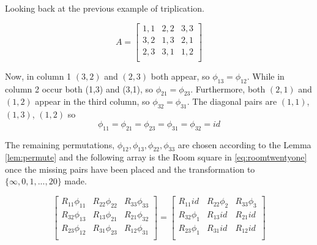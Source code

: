 \begin{example}
Looking back at the previous example of triplication.

\begin{equation}
 A = \begin{bmatrix}
  1,1 & 2,2 & 3,3 \\
  3,2 & 1,3 & 2,1 \\
  2,3 & 3,1 & 1,2 \\
 \end{bmatrix}
\end{equation}

Now, in column 1 $(3, 2)$ and $(2, 3)$ both appear, so $\phi _{13} = \phi _{12}$.
While in column 2 occur both (1,3) and (3,1), so $\phi _{21} = \phi _{23}$.
Furthermore, both $(2, 1)$ and $(1, 2)$ appear in the third column, so $\phi _{32} = \phi _{31}$.
The diagonal pairs are $(1, 1)$, $(1, 3)$, $(1, 2)$ so
\begin{equation}
\phi _{11} = \phi _{21} = \phi _{23} = \phi _{31} = \phi _{32} = id
\end{equation}

The remaining permutations, $\phi _{12}, \phi _{13}, \phi _{22}, \phi _{33}$ are chosen according to the Lemma \ref{lem:permute}
and the following array is the Room square in \ref{eq:roomtwentyone} once the missing pairs have been placed and the transformation to $\{\infty, 0, 1, ..., 20\}$ made.

\begin{equation}
  \begin{bmatrix}
   R_{11}\phi_{11} & R_{22}\phi_{22} & R_{33}\phi_{33} \\
   R_{32}\phi_{13} & R_{13}\phi_{21} & R_{21}\phi_{32} \\
   R_{23}\phi_{12} & R_{31}\phi_{23} & R_{12}\phi_{31} \\
  \end{bmatrix}
  =
  \begin{bmatrix}
      R_{11}id    & R_{22}\phi_{2} & R_{33}\phi_{3} \\
   R_{32}\phi_{1} &   R_{13}id     &    R_{21}id    \\
   R_{23}\phi_{1} &   R_{31}id     &    R_{12}id    \\
  \end{bmatrix}
\end{equation}

\end{example}
